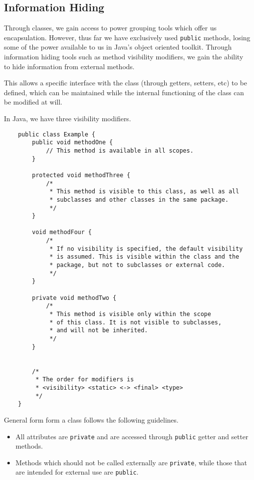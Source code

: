 \documentclass[12pt]{report}
\newcommand{\code}[1]{\lstinline{#1}}
\begin{document}
\begin{flushleft}
\subsection*{Information Hiding}

Through classes, we gain access to power grouping tools which offer us 
encapsulation. However, thus far we have exclusively used \code{public} 
methods, losing some of the power available to us in Java's object oriented
toolkit. Through information hiding tools such as method visibility modifiers,
we gain the ability to hide information from external methods. \par
This allows a specific interface with the class (through getters, setters, etc)
to be defined, which can be maintained while the internal functioning of the
class can be modified at will. \par
In Java, we have three visibility modifiers.

\begin{lstlisting}
    public class Example {
        public void methodOne {
            // This method is available in all scopes.
        }

        protected void methodThree {
            /*
             * This method is visible to this class, as well as all
             * subclasses and other classes in the same package.
             */
        }

        void methodFour {
            /*
             * If no visibility is specified, the default visibility
             * is assumed. This is visible within the class and the
             * package, but not to subclasses or external code.
             */
        }

        private void methodTwo {
            /*
             * This method is visible only within the scope
             * of this class. It is not visible to subclasses,
             * and will not be inherited.
             */
        }


        /*
         * The order for modifiers is
         * <visibility> <static> <-> <final> <type> 
         */
    }
\end{lstlisting}

General form form a class follows the following guidelines.

\begin{itemize}
    \item All attributes are \code{private} and are accessed through 
        \code{public} getter and setter methods.
    \item Methods which should not be called externally are \code{private},
        while those that are intended for external use are \code{public}.
\end{itemize}


\end{flushleft}
\end{document}
